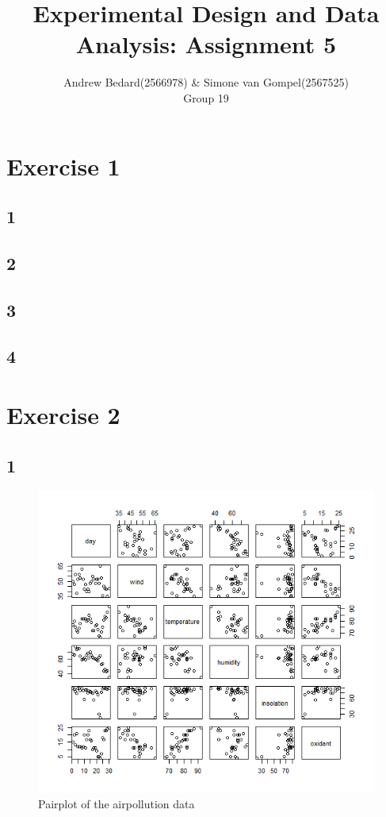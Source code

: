 \documentclass{article}
\title{Experimental Design and Data Analysis: Assignment 5}
\author{Andrew Bedard(2566978) \& Simone van Gompel(2567525) \\ Group 19}
\begin{document}
  \maketitle

  \section*{Exercise 1}
    \subsection*{1}
    \subsection*{2}
    \subsection*{3}
    \subsection*{4}
    
  \section*{Exercise 2}
    \subsection*{1}
      \begin{figure}[H]
          \centering
          \includegraphics[scale=0.6]{../results/2_1.png}
          \caption{Pairplot of the airpollution data}
          \label{fig:BoxHours}
      \end{figure} 
\end{document}
